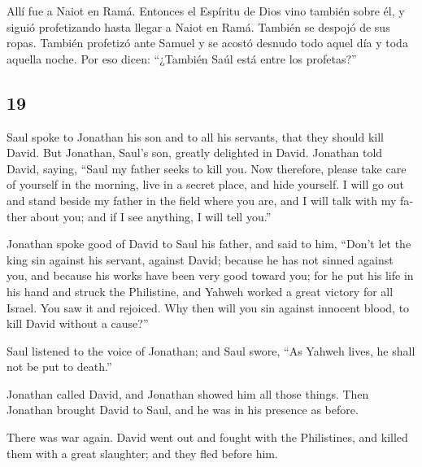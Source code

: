 \begin{paracol}{2}
 Allí fue a Naiot en Ramá. Entonces el Espíritu de Dios
vino también sobre él, y siguió profetizando hasta llegar a Naiot en
Ramá.  También se despojó de sus ropas. También profetizó
ante Samuel y se acostó desnudo todo aquel día y toda aquella noche. Por
eso dicen: ``¿También Saúl está entre los profetas?''

\switchcolumn
\begin{otherlanguage}{english}

\hypertarget{section-37}{%
\section{19}\label{section-37}}

 Saul spoke to Jonathan his son and to all his servants,
that they should kill David. But Jonathan, Saul's son, greatly delighted
in David.  Jonathan told David, saying, ``Saul my father
seeks to kill you. Now therefore, please take care of yourself in the
morning, live in a secret place, and hide yourself.  I
will go out and stand beside my father in the field where you are, and I
will talk with my father about you; and if I see anything, I will tell
you.''

 Jonathan spoke good of David to Saul his father, and said
to him, ``Don't let the king sin against his servant, against David;
because he has not sinned against you, and because his works have been
very good toward you;  for he put his life in his hand and
struck the Philistine, and Yahweh worked a great victory for all Israel.
You saw it and rejoiced. Why then will you sin against innocent blood,
to kill David without a cause?''

 Saul listened to the voice of Jonathan; and Saul swore,
``As Yahweh lives, he shall not be put to death.''

 Jonathan called David, and Jonathan showed him all those
things. Then Jonathan brought David to Saul, and he was in his presence
as before.

 There was war again. David went out and fought with the
Philistines, and killed them with a great slaughter; and they fled
before him.


\end{otherlanguage}
\end{paracol}
